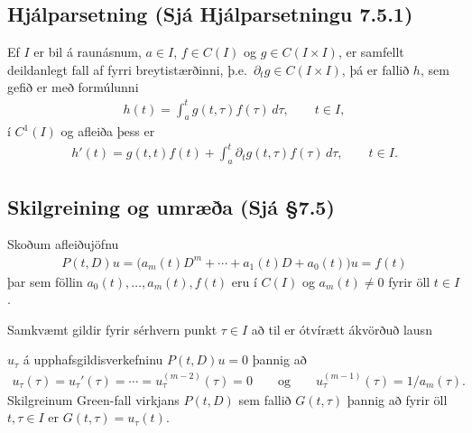 \documentclass[a4paper,10pt,icelandic]{sphinxmanual}
\begin{document}
\subsection{Hjálparsetning (Sjá Hjálparsetningu 7.5.1)}
\label{\detokenize{Kafli07:hjalparsetning-sja-hjalparsetningu-7-5-1}}
Ef \(I\) er bil á raunásnum, \(a\in I\), \(f\in C(I)\) og \(g\in C(I\times I)\), er samfellt deildanlegt fall af fyrri breytistærðinni, þ.e. \({\partial}_tg\in C(I\times I)\), þá er fallið \(h\), sem gefið er með formúlunni
\begin{equation*}
\begin{split}h(t)=\int_a^t g(t, \tau)f(\tau) \, d\tau, \qquad t\in I,\end{split}
\end{equation*}
í \(C^1(I)\) og afleiða þess er
\begin{equation*}
\begin{split}h'(t)=g(t,t)f(t)+\int_a^t \partial_tg(t,\tau)f(\tau) \, d\tau,
\qquad t\in I.\end{split}
\end{equation*}

\subsection{Skilgreining og umræða (Sjá \S{}7.5)}
\label{\detokenize{Kafli07:skilgreining-og-umraea-sja-7-5}}
Skoðum afleiðujöfnu
\begin{equation*}
\begin{split}P(t,D)u=\big(a_m(t)D^m+\cdots+a_1(t)D+a_0(t)\big)u=f(t)\end{split}
\end{equation*}
þar sem föllin \(a_0(t),\dots,a_m(t),f(t)\) eru í \(C(I)\) og \(a_m(t)\neq 0\) fyrir öll \(t\in I\).

Samkvæmt   gildir fyrir sérhvern punkt \(\tau\in I\) að til er ótvírætt ákvörðuð lausn

\(u_\tau\) á upphafsgildisverkefninu \(P(t,D)u=0\) þannig að
\begin{equation*}
\begin{split}u_\tau(\tau)=u_\tau'(\tau)=\cdots=u_\tau^{(m-2)}(\tau)=0\qquad\mbox{og}\qquad
u_\tau^{(m-1)}(\tau)=1/a_m(\tau).\end{split}
\end{equation*}
Skilgreinum Green-fall virkjans \(P(t, D)\) sem fallið
\(G(t,\tau)\) þannig að fyrir öll \(t,\tau\in I\) er
\(G(t,\tau)=u_\tau(t)\).
\end{document}

